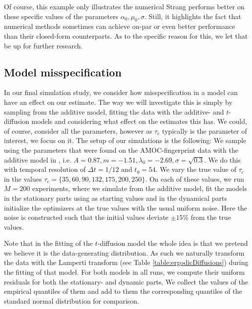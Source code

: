 Of course, this example only illustrates the numerical Strang performs better on these specific values of the parameters $\alpha_0, \mu_0, \sigma$. Still, it highlights the fact that numerical methods sometimes can achieve on-par or even better performance than their closed-form counterparts. As to the specific reason for this, we let that be up for further research.
\subsection{Model misspecification}
In our final simulation study, we consider how misspecification in a model can have an effect on our estimate. The way we will investigate this is simply by sampling from the additive model, fitting the data with the additive- and $t$-diffusion models and considering what effect on the estimates this has. We could, of course, consider all the parameters, however as $\tau_c$ typically is the parameter of interest, we focus on it. The setup of our simulations is the following: We sample using the parameters that were found on the AMOC-fingerprint data with the additive model in \cite[Figure 6]{Ditlevsen2023}, i.e. $A = 0.87, m = -1.51, \lambda_0 = -2.69, \sigma = \sqrt{0.3}$. We do this with temporal resolution of $\Delta t = 1/12$ and $t_0 =54$. We vary the true value of $\tau_c$ in the values $\tau_c = \{35, 60, 90, 132, 175, 200, 250\}$. On each of these values, we run $M = 200$ experiments, where we simulate from the additive model, fit the models in the stationary parts using \cite[equation (S4-S6)]{DitlevsenSupplementary} as starting values and in the dynamical parts initialize the optimizers at the true values with the usual uniform noise. Here the noise is constructed such that the initial values deviate $\pm 15\%$ from the true values.

Note that in the fitting of the $t$-diffusion model the whole idea is that we pretend we believe it is the data-generating distribution. As such we naturally transform the data with the Lamperti transform (see Table \ref{table:ergodicDiffusions}) during the fitting of that model. For both models in all runs, we compute their uniform residuals for both the stationary- and dynamic parts. We collect the values of the empirical quantiles of them and add to them the corresponding quantiles of the standard normal distribution for comparison.

